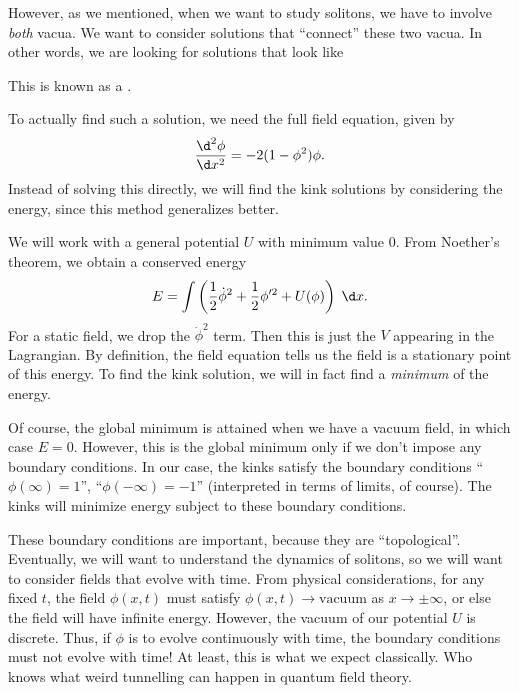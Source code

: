 \documentclass[a4paper]{article}
\begin{document}
However, as we mentioned, when we want to study solitons, we have to involve \emph{both} vacua. We want to consider solutions that ``connect'' these two vacua. In other words, we are looking for solutions that look like
\begin{center}
\end{center}
This is known as a .

To actually find such a solution, we need the full field equation, given by
\[
  \frac{\d^2 \phi}{\d x^2} = -2 (1 - \phi^2) \phi.
\]
Instead of solving this directly, we will find the kink solutions by considering the energy, since this method generalizes better.

We will work with a general potential $U$ with minimum value $0$. From Noether's theorem, we obtain a conserved energy
\[
  E = \int \left(\frac{1}{2} \dot{\phi}^2 + \frac{1}{2} \phi'^2 + U(\phi)\right)\;\d x.
\]
For a static field, we drop the $\dot{\phi}^2$ term. Then this is just the $V$ appearing in the Lagrangian. By definition, the field equation tells us the field is a stationary point of this energy. To find the kink solution, we will in fact find a \emph{minimum} of the energy.

Of course, the global minimum is attained when we have a vacuum field, in which case $E = 0$. However, this is the global minimum only if we don't impose any boundary conditions. In our case, the kinks satisfy the boundary conditions ``$\phi(\infty) = 1$'', ``$\phi(-\infty) = -1$'' (interpreted in terms of limits, of course). The kinks will minimize energy subject to these boundary conditions.

These boundary conditions are important, because they are ``topological''. Eventually, we will want to understand the dynamics of solitons, so we will want to consider fields that evolve with time. From physical considerations, for any fixed $t$, the field $\phi(x, t)$ must satisfy $\phi(x, t) \to \text{vacuum}$ as $x \to \pm \infty$, or else the field will have infinite energy. However, the vacuum of our potential $U$ is discrete. Thus, if $\phi$ is to evolve continuously with time, the boundary conditions must not evolve with time! At least, this is what we expect classically. Who knows what weird tunnelling can happen in quantum field theory.
\end{document}
